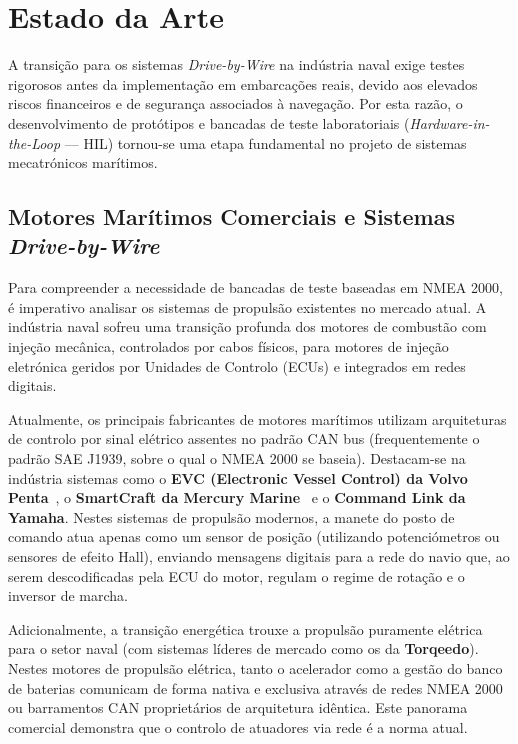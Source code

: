 \chapter{Estado da Arte}
\label{chap:estado_arte}

A transição para os sistemas \textit{Drive-by-Wire} na indústria naval exige testes rigorosos antes da implementação em embarcações reais, devido aos elevados riscos financeiros e de segurança associados à navegação. Por esta razão, o desenvolvimento de protótipos e bancadas de teste laboratoriais (\textit{Hardware-in-the-Loop} --- HIL) tornou-se uma etapa fundamental no projeto de sistemas mecatrónicos marítimos.

\section{Motores Marítimos Comerciais e Sistemas \textit{Drive-by-Wire}}
Para compreender a necessidade de bancadas de teste baseadas em NMEA 2000, é imperativo analisar os sistemas de propulsão existentes no mercado atual. A indústria naval sofreu uma transição profunda dos motores de combustão com injeção mecânica, controlados por cabos físicos, para motores de injeção eletrónica geridos por Unidades de Controlo (ECUs) e integrados em redes digitais.

Atualmente, os principais fabricantes de motores marítimos utilizam arquiteturas de controlo por sinal elétrico assentes no padrão CAN bus (frequentemente o padrão SAE J1939, sobre o qual o NMEA 2000 se baseia). Destacam-se na indústria sistemas como o \textbf{EVC (Electronic Vessel Control) da Volvo Penta}~\cite{volvo_penta_evc}, o \textbf{SmartCraft da Mercury Marine}~\cite{mercury_smartcraft} e o \textbf{Command Link da Yamaha}. Nestes sistemas de propulsão modernos, a manete do posto de comando atua apenas como um sensor de posição (utilizando potenciómetros ou sensores de efeito Hall), enviando mensagens digitais para a rede do navio que, ao serem descodificadas pela ECU do motor, regulam o regime de rotação e o inversor de marcha.

Adicionalmente, a transição energética trouxe a propulsão puramente elétrica para o setor naval (com sistemas líderes de mercado como os da \textbf{Torqeedo}). Nestes motores de propulsão elétrica, tanto o acelerador como a gestão do banco de baterias comunicam de forma nativa e exclusiva através de redes NMEA 2000 ou barramentos CAN proprietários de arquitetura idêntica. Este panorama comercial demonstra que o controlo de atuadores via rede é a norma atual.

